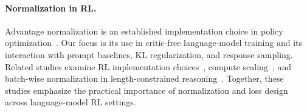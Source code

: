 \paragraph{Normalization in RL.}
Advantage normalization is an established implementation choice in policy optimization~\citep{andrychowicz2020matters}. Our focus is its use in critic-free language-model training and its interaction with prompt baselines, KL regularization, and response sampling. Related studies examine RL implementation choices~\citep{liu2025part}, compute scaling~\citep{khatri2025art}, and batch-wise normalization in length-constrained reasoning~\citep{liu2025dler}. Together, these studies emphasize the practical importance of normalization and loss design across language-model RL settings.

